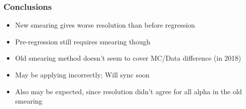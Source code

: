 \documentclass{beamer}
\newcommand{\beginbackup}{
  \newcounter{framenumbervorappendix}
  \setcounter{framenumbervorappendix}{\value{framenumber}}
}
\newcommand{\backupend}{
  \addtocounter{framenumbervorappendix}{-\value{framenumber}}
  \addtocounter{framenumber}{\value{framenumbervorappendix}}
}
\begin{document}
\begin{frame}
  \frametitle{Conclusions}

  \begin{itemize}
  \item New smearing gives worse resolution than before regression
  \item Pre-regression still requires smearing though
  \item Old smearing method doesn't seem to cover MC/Data difference (in 2018)
  \item May be applying incorrectly; Will sync soon
  \item Also may be expected, since resolution didn't agree for all alpha in the old smearing
  \end{itemize}

\end{frame}

\begin{comment}
\beginbackup

\begin{frame}
  \centering
    {\Huge \bf\sffamily Backup Slides}
\end{frame}



\backupend
\end{comment}
\end{document}
